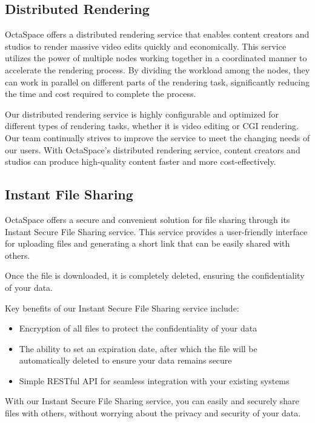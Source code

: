\subsection{Distributed Rendering}

OctaSpace offers a distributed rendering service that enables content creators and studios to render massive video edits quickly and economically. This service utilizes the power of multiple nodes working together in a coordinated manner to accelerate the rendering process. By dividing the workload among the nodes, they can work in parallel on different parts of the rendering task, significantly reducing the time and cost required to complete the process.

Our distributed rendering service is highly configurable and optimized for different types of rendering tasks, whether it is video editing or CGI rendering. Our team continually strives to improve the service to meet the changing needs of our users. With OctaSpace's distributed rendering service, content creators and studios can produce high-quality content faster and more cost-effectively.

\subsection{Instant File Sharing}

OctaSpace offers a secure and convenient solution for file sharing through its Instant Secure File Sharing service. This service provides a user-friendly interface for uploading files and generating a short link that can be easily shared with others.

Once the file is downloaded, it is completely deleted, ensuring the confidentiality of your data.

Key benefits of our Instant Secure File Sharing service include:

\begin{itemize}
    \item Encryption of all files to protect the confidentiality of your data
    \item The ability to set an expiration date, after which the file will be automatically deleted to ensure your data remains secure
    \item Simple RESTful API for seamless integration with your existing systems
\end{itemize}

With our Instant Secure File Sharing service, you can easily and securely share files with others, without worrying about the privacy and security of your data.
